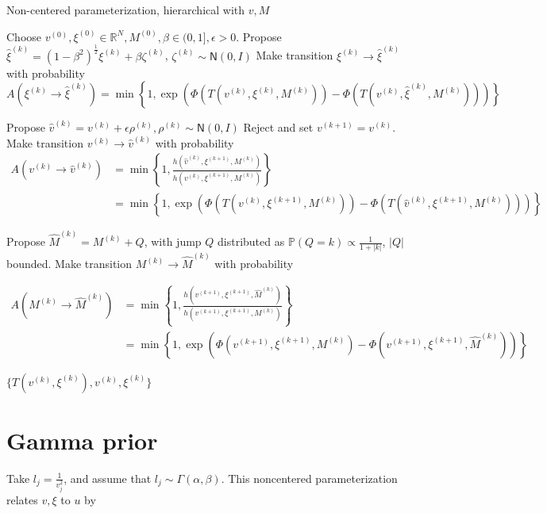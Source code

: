 \documentclass{siamart1116}
\begin{document}
    \begin{algorithm}
    \caption{Non-centered parameterization, hierarchical with $v, M$}
    \label{alg:hier_v_M}
    \begin{algorithmic}
    \State Choose $v^{(0)}, \xi^{(0)} \in \mathbb{R}^N, M^{(0)}, \beta \in (0, 1], \epsilon > 0$.
    \State Propose $\hat\xi^{(k)} = (1-\beta^2)^{\frac{1}{2}}\xi^{(k)} + \beta \zeta^{(k)}$, $\zeta^{(k)} \sim \mathsf{N}(0, I)$
    \State Make transition $\xi^{(k)} \to \hat\xi^{(k)}$ with probability
    \[ A(\xi^{(k)} \to \hat\xi^{(k)}) = \min\left\{1, \exp\left(\Phi(T(v^{(k)}, \xi^{(k)}, M^{(k)})) - \Phi(T(v^{(k)}, \hat \xi^{(k)}, M^{(k)}))\right) \right\}\]

    \State Propose $\hat v^{(k)} = v^{(k)} + \epsilon \rho^{(k)}, \rho^{(k)} \sim \mathsf{N}(0,I)$
        \State Reject and set $v^{(k+1)} = v^{(k)}$.
    \Else
    \State Make transition $v^{(k)} \to \hat v^{(k)}$ with probability
    \begin{align*}
     A(v^{(k)} \to \hat v^{(k)}) &= \min\left\{1, \frac{h(\hat v^{(k)}, \xi^{(k+1)}, M^{(k)})}{h(v^{(k)}, \xi^{(k+1)}, M^{(k)})}\right\} \\
     &= \min\left\{1, \exp\left(\Phi(T(v^{(k)}, \xi^{(k+1)},M^{(k)}))-\Phi(T(\hat v^{(k)}, \xi^{(k+1)}, M^{(k)})) \right) \right\}
     \end{align*}
    \EndIf

    \State Propose $\hat M^{(k)} = M^{(k)} + Q$, with jump $Q$ distributed as $\mathbb{P}(Q=k) \propto \frac{1}{1+|k|}$, $|Q|$ bounded.
    \State Make transition $M^{(k)} \to \hat M^{(k)}$ with probability

    \begin{align*}
    A(M^{(k)} \to \hat M^{(k)}) &= \min\left\{1, \frac{h( v^{(k+1)}, \xi^{(k+1)}, \hat M^{(k)}  )}{h( v^{(k+1)}, \xi^{(k+1)}, M^{(k)} )} \right\}\\
    &=\min\left\{1, \exp\left(\Phi(v^{(k+1)}, \xi^{(k+1)}, M^{(k)} ) - \Phi(v^{(k+1)}, \xi^{(k+1)}, \hat M^{(k)} )\right)\right\}
    \end{align*}

    \EndFor
    \State \Return $\{ T(v^{(k)},\xi^{(k)}), v^{(k)}, \xi^{(k)} \}$
    \end{algorithmic}
    \end{algorithm}

\section{Gamma prior}
    Take $l_j = \frac{1}{v_j^2}$, and assume that $l_j \sim \Gamma(\alpha, \beta)$. This noncentered parameterization relates $v, \xi$ to $u$ by
\end{document}
